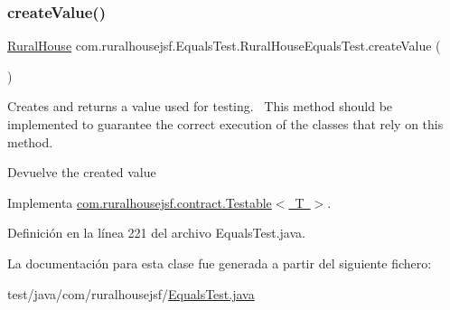 \subsubsection{\texorpdfstring{createValue()}{createValue()}}
{\footnotesize\ttfamily \mbox{\hyperlink{classcom_1_1ruralhousejsf_1_1domain_1_1_rural_house}{Rural\+House}} com.\+ruralhousejsf.\+Equals\+Test.\+Rural\+House\+Equals\+Test.\+create\+Value (\begin{DoxyParamCaption}{ }\end{DoxyParamCaption})}

Creates and returns a value used for testing.~\newline
 This method should be implemented to guarantee the correct execution of the classes that rely on this method.

\begin{DoxyReturn}{Devuelve}
the created value 
\end{DoxyReturn}


Implementa \mbox{\hyperlink{interfacecom_1_1ruralhousejsf_1_1contract_1_1_testable_ae4546a381488faaba1ef7c0f8688de9c}{com.\+ruralhousejsf.\+contract.\+Testable$<$ T $>$}}.



Definición en la línea 221 del archivo Equals\+Test.\+java.



La documentación para esta clase fue generada a partir del siguiente fichero\+:\begin{DoxyCompactItemize}
\item 
test/java/com/ruralhousejsf/\mbox{\hyperlink{_equals_test_8java}{Equals\+Test.\+java}}\end{DoxyCompactItemize}

